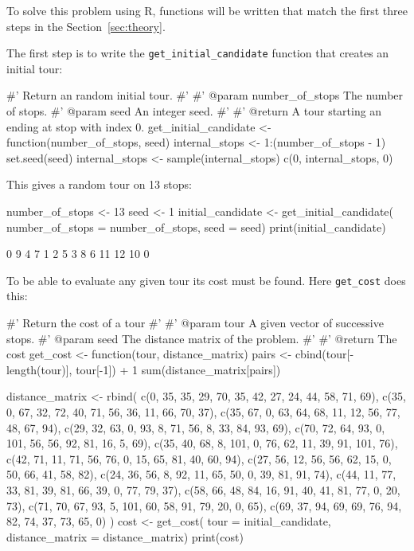 To solve this problem using R, functions will be written that match the
first three steps in the Section~\ref{sec:theory}.

The first step is to write the \texttt{get_initial_candidate}
function that creates an initial tour:

\begin{Rin}
#' Return an random initial tour.
#'
#' @param number_of_stops The number of stops.
#' @param seed An integer seed.
#'
#' @return A tour starting an ending at stop with index 0.
get_initial_candidate <- function(number_of_stops, seed){
  internal_stops <- 1:(number_of_stops - 1)
  set.seed(seed)
  internal_stops <- sample(internal_stops)
  c(0, internal_stops, 0)
}
\end{Rin}

This gives a random tour on 13 stops:

\begin{Rin}
number_of_stops <- 13
seed <- 1
initial_candidate <- get_initial_candidate(
  number_of_stops = number_of_stops,
  seed = seed)
print(initial_candidate)
\end{Rin}

\begin{Rout}
 [1]  0  9  4  7  1  2  5  3  8  6 11 12 10  0
\end{Rout}

To be able to evaluate any given tour its cost must be found. Here
\texttt{get_cost}  does this:

\begin{Rin}
#' Return the cost of a tour
#'
#' @param tour A given vector of successive stops.
#' @param seed The distance matrix of the problem.
#'
#' @return The cost
get_cost <- function(tour, distance_matrix){
  pairs <-  cbind(tour[-length(tour)], tour[-1]) + 1
  sum(distance_matrix[pairs])
}
\end{Rin}

\begin{Rin}
distance_matrix <- rbind(
        c(0, 35, 35, 29, 70, 35, 42, 27, 24, 44, 58, 71, 69),
        c(35, 0, 67, 32, 72, 40, 71, 56, 36, 11, 66, 70, 37),
        c(35, 67, 0, 63, 64, 68, 11, 12, 56, 77, 48, 67, 94),
        c(29, 32, 63, 0, 93, 8, 71, 56, 8, 33, 84, 93, 69),
        c(70, 72, 64, 93, 0, 101, 56, 56, 92, 81, 16, 5, 69),
        c(35, 40, 68, 8, 101, 0, 76, 62, 11, 39, 91, 101, 76),
        c(42, 71, 11, 71, 56, 76, 0, 15, 65, 81, 40, 60, 94),
        c(27, 56, 12, 56, 56, 62, 15, 0, 50, 66, 41, 58, 82),
        c(24, 36, 56, 8, 92, 11, 65, 50, 0, 39, 81, 91, 74),
        c(44, 11, 77, 33, 81, 39, 81, 66, 39, 0, 77, 79, 37),
        c(58, 66, 48, 84, 16, 91, 40, 41, 81, 77, 0, 20, 73),
        c(71, 70, 67, 93, 5, 101, 60, 58, 91, 79, 20, 0, 65),
        c(69, 37, 94, 69, 69, 76, 94, 82, 74, 37, 73, 65, 0)
)
cost <- get_cost(
  tour = initial_candidate,
  distance_matrix = distance_matrix)
print(cost)
\end{Rin}

